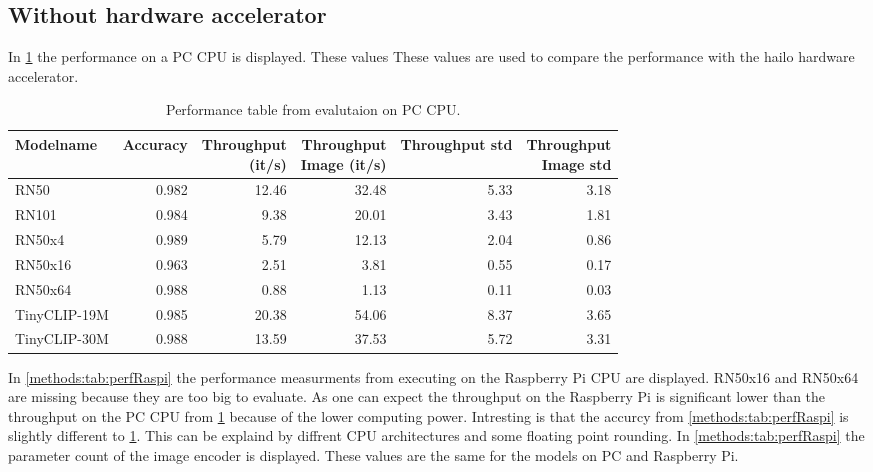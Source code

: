 \subsection{Without hardware accelerator}
In \cref{methods:tab:perfPC} the performance on a PC CPU is displayed.
These values 
These values are used to compare the performance with the hailo hardware accelerator.

\begin{table}[]
    \centering
    \begin{tabular}{l|rrrrr}
    \hline
        Modelname & Accuracy & \makecell{Throughput\\(it/s)} & \makecell{Throughput \\ Image (it/s)} & Throughput std & \makecell{Throughput\\Image std} \\ \hline
        RN50 & 0.982 & 12.46 & 32.48 & 5.33 & 3.18 \\ 
        RN101 & 0.984 & 9.38 & 20.01 & 3.43 & 1.81 \\ 
        RN50x4 & 0.989 & 5.79 & 12.13 & 2.04 & 0.86 \\ 
        RN50x16 & 0.963 & 2.51 & 3.81 & 0.55 & 0.17 \\ 
        RN50x64 & 0.988 & 0.88 & 1.13 & 0.11 & 0.03 \\ 
        TinyCLIP-19M & 0.985 & 20.38 & 54.06 & 8.37 & 3.65 \\ 
        TinyCLIP-30M & 0.988 & 13.59 & 37.53 & 5.72 & 3.31 \\ 
    \end{tabular}
    \caption{Performance table from evalutaion on PC CPU.}
    \label{methods:tab:perfPC}
\end{table}

In \cref{methods:tab:perfRaspi} the performance measurments from executing on the Raspberry Pi CPU are displayed.
RN50x16 and RN50x64 are missing because they are too big to evaluate.
As one can expect the throughput on the Raspberry Pi is significant lower than the throughput on the PC CPU from \cref{methods:tab:perfPC} because of the lower computing power.
Intresting is that the accurcy from \cref{methods:tab:perfRaspi} is slightly different to \cref{methods:tab:perfPC}.
This can be explaind by diffrent CPU architectures and some floating point rounding.
In \cref{methods:tab:perfRaspi} the parameter count of the image encoder is displayed. These values are the same for the models on PC and Raspberry Pi.

